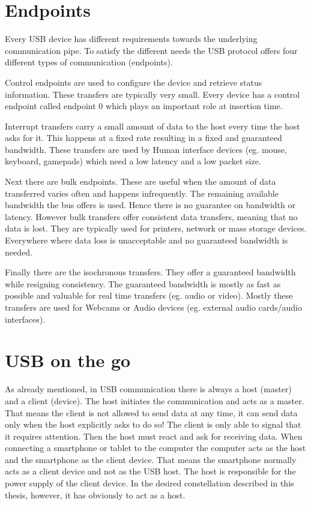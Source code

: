 \section{Endpoints}

Every USB device has different requirements towards the underlying communication pipe. To satisfy the different needs the USB protocol offers four different types of communication (endpoints).

Control endpoints are used to configure the device and retrieve status information. These transfers are typically very small. Every device has a control endpoint called endpoint 0 which plays an important role at insertion time\cite{free_usb}.

Interrupt transfers carry a small amount of data to the host every time the host asks for it. This happens at a fixed rate resulting in a fixed and guaranteed bandwidth. These transfers are used by Human interface devices (eg. mouse, keyboard, gamepads) which need a low latency and a low packet size.

Next there are bulk endpoints. These are useful when the amount of data transferred varies often and happens infrequently. The remaining available bandwidth the bus offers is used. Hence there is no guarantee on bandwidth or latency. However bulk transfers offer consistent data transfers, meaning that no data is lost. They are typically used for printers, network or mass storage devices. Everywhere where data loss is unacceptable and no guaranteed bandwidth is needed.

Finally there are the isochronous transfers. They offer a guaranteed bandwidth while resigning consistency. The guaranteed bandwidth is mostly as fast as possible and valuable for real time transfers (eg. audio or video). Mostly these transfers are used for Webcams or Audio devices (eg. external audio cards/audio interfaces)\cite{free_usb}.

\section{USB on the go}

As already mentioned, in USB communication there is always a host (master) and a client (device). The host initiates the communication and acts as a master. That means the client is not allowed to send data at any time, it can send data only when the host explicitly asks to do so! The client is only able to signal that it requires attention. Then the host must react and ask for receiving data. When connecting a smartphone or tablet to the computer the computer acts as the host and the smartphone as the client device. That means the smartphone normally acts as a client device and not as the USB host. The host is responsible for the power supply of the client device. In the desired constellation described in this thesis, however, it has obviously to act as a host. 

